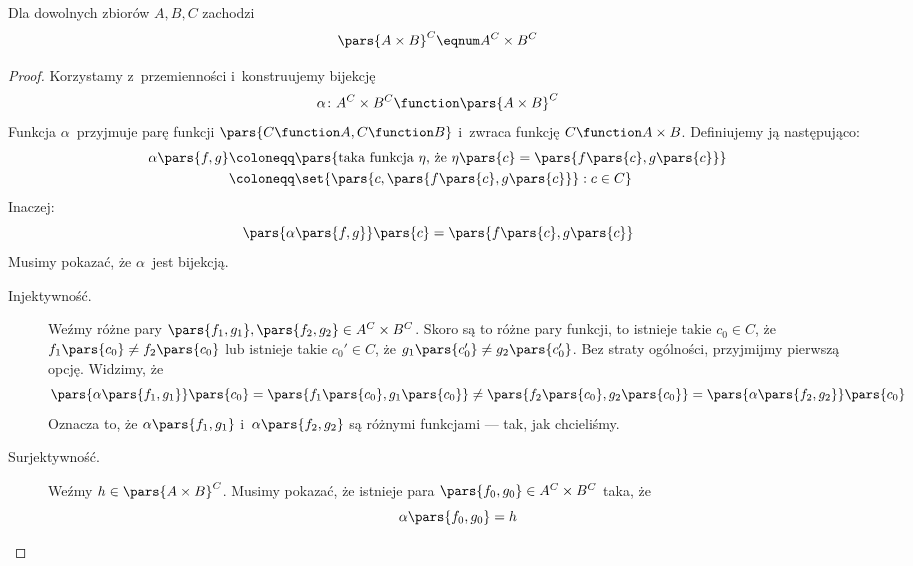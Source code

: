 \begin{theorem}
Dla dowolnych zbiorów \(A, B, C\) zachodzi
\begin{equation*}
    \pars{A \times B}^C \eqnum A^C \times B^C
\end{equation*}
\end{theorem}
\begin{proof}
Korzystamy z~przemienności i~konstruujemy bijekcję
\begin{equation*}
    \alpha\colon A^C \times B^C \function \pars{A \times B}^C
\end{equation*}
Funkcja \(\alpha\)~przyjmuje parę funkcji \(\pars{C \function A, C \function B}\) i~zwraca funkcję \(C \function A \times B\). Definiujemy ją następująco:
\begin{equation*}
    \begin{split}
        \alpha\pars{f, g}
            &\coloneqq \pars{\text{taka funkcja \(\eta\), że \(\eta\pars{c} = \pars{f\pars{c}, g\pars{c}}\)}}\\
            &\coloneqq \set{\pars{c, \pars{f\pars{c}, g\pars{c}}} : c \in C}
    \end{split}
\end{equation*}
Inaczej:
\begin{equation*}
    \pars{\alpha\pars{f, g}}\pars{c} = \pars{f\pars{c}, g\pars{c}}
\end{equation*}
Musimy pokazać, że \(\alpha\)~jest bijekcją.
\begin{description}
    \item[Injektywność.] Weźmy różne pary \(\pars{f_1, g_1}, \pars{f_2, g_2} \in A^C \times B^C\). Skoro są to różne pary funkcji, to istnieje takie \(c_0 \in C\), że \(f_1\pars{c_0} \neq f_2\pars{c_0}\) lub istnieje takie \(c_0' \in C\), że \(g_1\pars{c_0'} \neq g_2\pars{c_0'}\). Bez straty ogólności, przyjmijmy pierwszą opcję. Widzimy, że
    \begin{equation*}
        \pars{\alpha\pars{f_1, g_1}}\pars{c_0} = \pars{f_1\pars{c_0}, g_1\pars{c_0}} \neq \pars{f_2\pars{c_0}, g_2\pars{c_0}} = \pars{\alpha\pars{f_2, g_2}}\pars{c_0}
    \end{equation*}
    Oznacza to, że \(\alpha\pars{f_1, g_1}\) i~\(\alpha\pars{f_2, g_2}\) są różnymi funkcjami --- tak, jak chcieliśmy.
    \item[Surjektywność.] Weźmy \(h \in \pars{A \times B}^C\). Musimy pokazać, że istnieje para \(\pars{f_0, g_0} \in A^C \times B^C\) taka, że
        \begin{equation*}
            \alpha\pars{f_0, g_0} = h

\end{equation*}
\end{description}
\end{proof}

